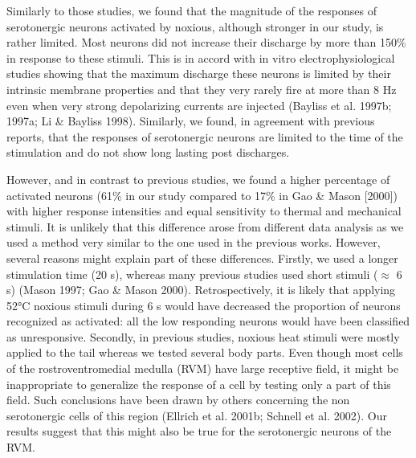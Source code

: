 \documentclass[a4paper,12pt,twoside]{report}
\begin{document}
Similarly to those studies, we found that the magnitude of the responses of serotonergic neurons activated by noxious, although stronger in our study, is rather limited. Most neurons did not increase their discharge by more than 150\% in response to these stimuli. This is in accord with in vitro electrophysiological studies showing that the maximum discharge these neurons is limited by their intrinsic membrane properties and that they very rarely fire at more than 8 Hz even when very strong depolarizing currents are injected (Bayliss et al. 1997b; 1997a; Li \& Bayliss 1998). Similarly, we found, in agreement with previous reports, that the responses of serotonergic neurons are limited to the time of the stimulation and do not show long lasting post discharges.

However, and in contrast to previous studies, we found a higher percentage of activated neurons (61\% in our study compared to 17\% in Gao \& Mason [2000]) with higher response intensities and equal sensitivity to thermal and mechanical stimuli. It is unlikely that this difference arose from different data analysis as we used a method very similar to the one used in the previous works. However, several reasons might explain part of these differences. Firstly, we used a longer stimulation time (20 s), whereas many previous studies used short stimuli ($\approx$ 6 s) (Mason 1997; Gao \& Mason 2000). Retrospectively, it is likely that applying 52°C noxious stimuli during 6 s would have decreased the proportion of neurons recognized as activated: all the low responding neurons would have been classified as unresponsive. Secondly, in previous studies, noxious heat stimuli were mostly applied to the tail whereas we tested several body parts. Even though most cells of the rostroventromedial medulla (RVM) have large receptive field, it might be inappropriate to generalize the response of a cell by testing only a part of this field. Such conclusions have been drawn by others concerning the non serotonergic cells of this region (Ellrich et al. 2001b; Schnell et al. 2002). Our results suggest that this might also be true for the serotonergic neurons of the RVM. 
\end{document}
